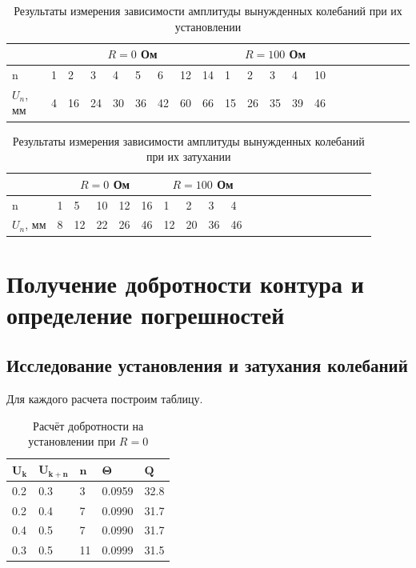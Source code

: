 \documentclass[10pt,a4paper]{article}
\begin{document}
	\begin{table}[h!]
\centering
\begin{tabular}{|l|l|l|l|l|l|l|l|l|l|l|l|l|l|l|l|l|l|l|l|l|}
\hline
 & \multicolumn{8}{|c|}{$R = 0$ Ом} & \multicolumn{5}{|c|}{$R = 100$ Ом} \\ \hline
n          & 1 & 2 & 3  & 4  & 5  & 6 & 12 & 14 & 1 & 2 & 3 & 4 & 10 \\ \hline
$U_{n}$, мм & 4 & 16 & 24 & 30 & 36 & 42 & 60 & 66 & 15 & 26 & 35 & 39 & 46 \\ \hline
\end{tabular}
\caption{Результаты измерения зависимости амплитуды вынужденных колебаний при их установлении}
\label{tab:Q_measuring_on_grown}
\end{table}	


\begin{table}[h!]
\centering
\begin{tabular}{|l|l|l|l|l|l|l|l|l|l|l|l|l|l|l|l|l|l|l|l|l|}
\hline
& \multicolumn{5}{|c|}{$R = 0$ Ом} & \multicolumn{4}{|c|}{$R = 100$ Ом} \\ \hline
n          & 1 & 5 & 10 & 12 & 16 & 1 & 2 & 3 & 4\\ \hline
$U_{n}$, мм & 8 & 12 & 22 & 26 & 46 & 12 & 20 & 36 & 46\\ \hline
\end{tabular}
\caption{Результаты измерения зависимости амплитуды вынужденных колебаний при их затухании}
\label{tab:Q_measuring_on_decrease}
\end{table}

	\section{Получение добротности контура и определение погрешностей}
	
    \subsection{Исследование установления и затухания колебаний}

Для каждого расчета построим таблицу.

\begin{table}[h!]
	\centering
	\begin{tabular}{|l|l|l|l|l|}
		\hline
		$\mathbf{U_k}$ & $\mathbf{U_{k+n}}$ & $\mathbf{n}$ & $\mathbf{\Theta}$ & $\mathbf{Q}$  \\ \hline
		0.2   & 0.3     & 3   & 0.0959   & 32.8 \\ \hline
		0.2   & 0.4     & 7   & 0.0990   & 31.7 \\ \hline
		0.4   & 0.5     & 7   & 0.0990   & 31.7 \\ \hline
		0.3   & 0.5     & 11  & 0.0999   & 31.5 \\ \hline
	\end{tabular}
\caption{Расчёт добротности на установлении при $R=0$}
\end{table}
\end{document}
